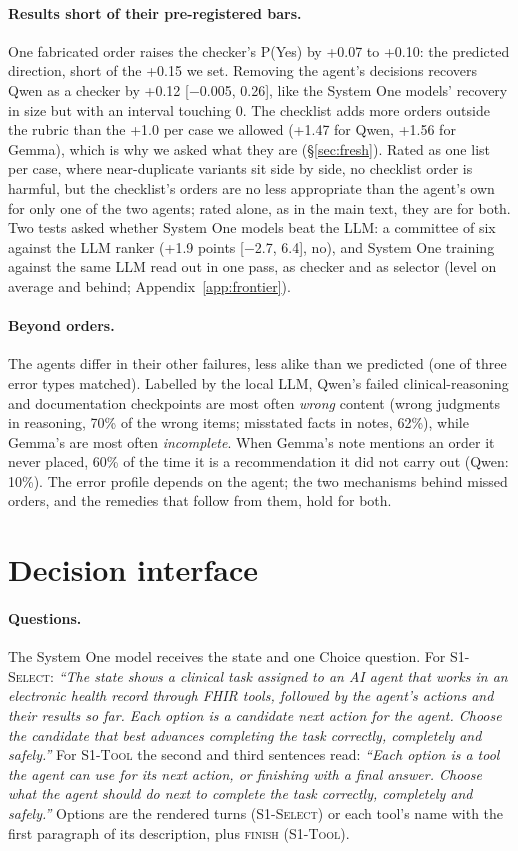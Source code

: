 \documentclass[11pt]{article}
\newcommand{\sel}{\textsc{S1-Select}}
\newcommand{\tool}{\textsc{S1-Tool}}
\begin{document}
\paragraph{Results short of their pre-registered bars.} One fabricated order raises the checker's P(Yes) by +0.07 to
+0.10: the predicted direction, short of the +0.15 we set. Removing the agent's decisions recovers Qwen as a checker
by +0.12 [$-$0.005, 0.26], like the System One models' recovery in size but with an interval touching 0. The checklist
adds more orders outside the rubric than the +1.0 per case we allowed (+1.47 for Qwen, +1.56 for Gemma), which is why
we asked what they are (\S\ref{sec:fresh}). Rated as one list per case, where near-duplicate variants sit side by
side, no checklist order is harmful, but the checklist's orders are no less appropriate than the agent's own for only
one of the two agents; rated alone, as in the main text, they are for both. Two tests asked whether System One models
beat the LLM: a committee of six against the LLM ranker (+1.9 points [$-$2.7, 6.4], no), and System One training
against the same LLM read out in one pass, as checker and as selector (level on average and behind;
Appendix~\ref{app:frontier}).

\paragraph{Beyond orders.} The agents differ in their other failures, less alike than we predicted (one of three
error types matched). Labelled by the local LLM, Qwen's failed clinical-reasoning and documentation checkpoints are
most often \emph{wrong} content (wrong judgments in reasoning, 70\% of the wrong items; misstated facts in notes,
62\%), while Gemma's are most often \emph{incomplete}. When Gemma's note mentions an order it never placed, 60\% of the
time it is a recommendation it did not carry out (Qwen: 10\%). The error profile depends on the agent; the two
mechanisms behind missed orders, and the remedies that follow from them, hold for both.


\section{Decision interface}\label{app:interface}

\paragraph{Questions.} The System One model receives the state and one Choice question. For \sel{}: \emph{``The state
shows a clinical task assigned to an AI agent that works in an electronic health record through FHIR tools, followed
by the agent's actions and their results so far. Each option is a candidate next action for the agent. Choose the
candidate that best advances completing the task correctly, completely and safely.''} For \tool{} the second and third
sentences read: \emph{``Each option is a tool the agent can use for its next action, or finishing with a final answer.
Choose what the agent should do next to complete the task correctly, completely and safely.''} Options are the
rendered turns (\sel) or each tool's name with the first paragraph of its description, plus \textsc{finish} (\tool).
\end{document}
